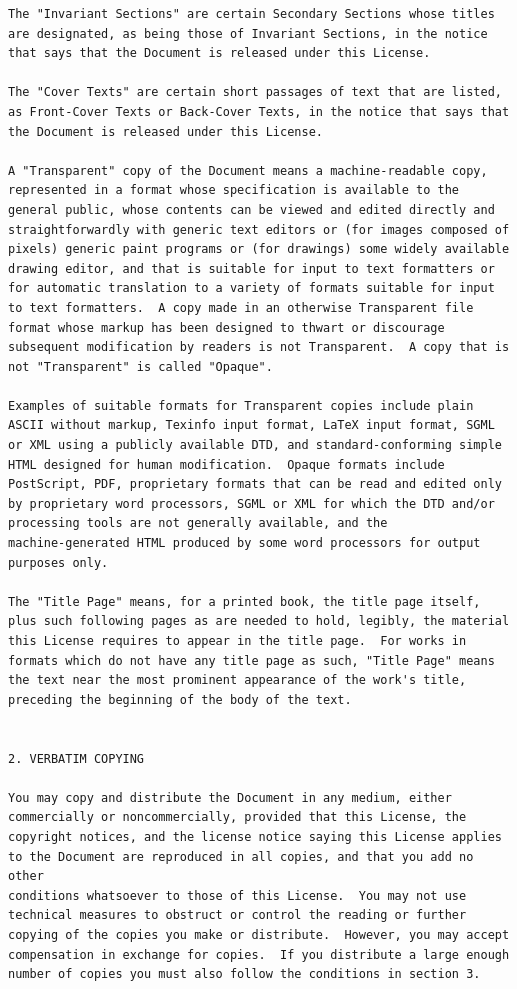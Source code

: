 \documentclass[12pt]{report}
\begin{document}
\begin{verbatim}
The "Invariant Sections" are certain Secondary Sections whose titles
are designated, as being those of Invariant Sections, in the notice
that says that the Document is released under this License.

The "Cover Texts" are certain short passages of text that are listed,
as Front-Cover Texts or Back-Cover Texts, in the notice that says that
the Document is released under this License.

A "Transparent" copy of the Document means a machine-readable copy,
represented in a format whose specification is available to the
general public, whose contents can be viewed and edited directly and
straightforwardly with generic text editors or (for images composed of
pixels) generic paint programs or (for drawings) some widely available
drawing editor, and that is suitable for input to text formatters or
for automatic translation to a variety of formats suitable for input
to text formatters.  A copy made in an otherwise Transparent file
format whose markup has been designed to thwart or discourage
subsequent modification by readers is not Transparent.  A copy that is
not "Transparent" is called "Opaque".

Examples of suitable formats for Transparent copies include plain
ASCII without markup, Texinfo input format, LaTeX input format, SGML
or XML using a publicly available DTD, and standard-conforming simple
HTML designed for human modification.  Opaque formats include
PostScript, PDF, proprietary formats that can be read and edited only
by proprietary word processors, SGML or XML for which the DTD and/or
processing tools are not generally available, and the
machine-generated HTML produced by some word processors for output
purposes only.

The "Title Page" means, for a printed book, the title page itself,
plus such following pages as are needed to hold, legibly, the material
this License requires to appear in the title page.  For works in
formats which do not have any title page as such, "Title Page" means
the text near the most prominent appearance of the work's title,
preceding the beginning of the body of the text.


2. VERBATIM COPYING

You may copy and distribute the Document in any medium, either
commercially or noncommercially, provided that this License, the
copyright notices, and the license notice saying this License applies
to the Document are reproduced in all copies, and that you add no other
conditions whatsoever to those of this License.  You may not use
technical measures to obstruct or control the reading or further
copying of the copies you make or distribute.  However, you may accept
compensation in exchange for copies.  If you distribute a large enough
number of copies you must also follow the conditions in section 3.


\end{verbatim}
\end{document}
